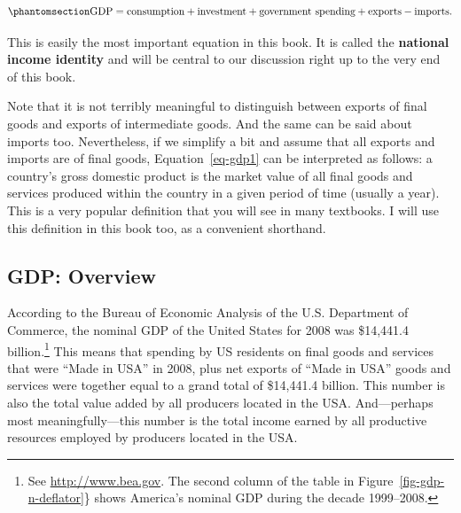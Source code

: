 \documentclass[
  letterpaper,
]{book}
\begin{document}
\begin{equation}\phantomsection\label{eq-gdp1}{
\hbox{GDP}=\hbox{consumption}+\hbox{investment}+\hbox{government spending}+\hbox{exports}-\hbox{imports}.
}\end{equation}

This is easily the most important equation in this book. It is called
the \textbf{national income identity}
and will be central to our discussion right up to the very end of this
book.

Note that it is not terribly meaningful to distinguish between exports
of final goods and exports of intermediate goods. And the same can be
said about imports too. Nevertheless, if we simplify a bit and assume
that all exports and imports are of final goods, Equation~\ref{eq-gdp1}
can be interpreted as follows: a country's gross domestic product is the
market value of all final goods and services produced within the country
in a given period of time (usually a year). This is a very popular
definition that you will see in many textbooks. I will use this
definition in this book too, as a convenient shorthand.

\subsection{GDP: Overview}\label{sec-gdp-overview}

According to the Bureau of Economic Analysis of the U.S. Department of
Commerce, the nominal GDP of the United States for 2008 was \$14,441.4
billion.\footnote{See \url{http://www.bea.gov}. The second column of the
  table in Figure~\ref{fig-gdp-n-deflator}\} shows America's nominal GDP
  during the decade 1999--2008.} This means that spending by US
residents on final goods and services that were ``Made in USA'' in 2008,
plus net exports of ``Made in USA'' goods and services were together
equal to a grand total of \$14,441.4 billion. This number is also the
total value added by all producers located in the USA. And---perhaps
most meaningfully---this number is the total income earned by all
productive resources employed by producers located in the USA.
\end{document}
